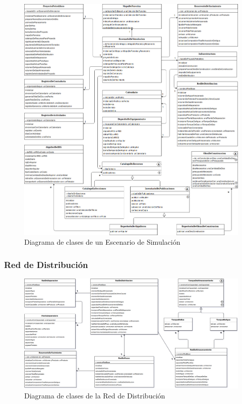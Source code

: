 \documentclass[10pt,a3paper, ,landscape]{article}
\begin{document}
\begin{figure}[H]
\centerline{\includegraphics[scale=0.5]{images/DiagramaDeClases_deEscenario.png}}
\caption{Diagrama de clases de un Escenario de Simulación}
\end{figure}

\subsubsection{Red de Distribución}

\begin{figure}[H]
\centerline{\includegraphics[scale=0.38]{images/DiagramaDeClases_deRedDeDistribucion.png}}
\caption{Diagrama de clases de la Red de Distribución}
\end{figure}
\end{document}
